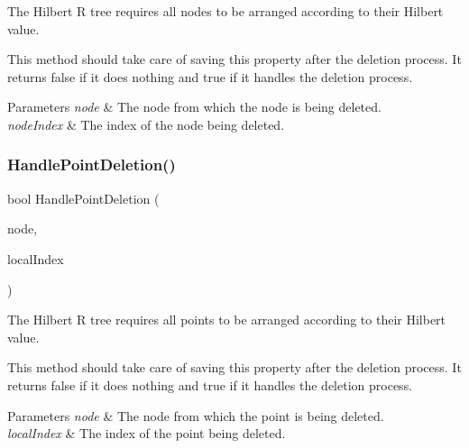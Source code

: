 The Hilbert R tree requires all nodes to be arranged according to their Hilbert value. 

This method should take care of saving this property after the deletion process. It returns false if it does nothing and true if it handles the deletion process.


\begin{DoxyParams}{Parameters}
{\em node} & The node from which the node is being deleted. \\
\hline
{\em node\+Index} & The index of the node being deleted. \\
\hline
\end{DoxyParams}
\mbox{\label{classmlpack_1_1tree_1_1HilbertRTreeAuxiliaryInformation_a58597b934c75ead9344fc5c75c753e10}} 
\subsubsection{Handle\+Point\+Deletion()}
{\footnotesize\ttfamily bool Handle\+Point\+Deletion (\begin{DoxyParamCaption}\item[{Tree\+Type $\ast$}]{node,  }\item[{const size\+\_\+t}]{local\+Index }\end{DoxyParamCaption})}



The Hilbert R tree requires all points to be arranged according to their Hilbert value. 

This method should take care of saving this property after the deletion process. It returns false if it does nothing and true if it handles the deletion process.


\begin{DoxyParams}{Parameters}
{\em node} & The node from which the point is being deleted. \\
\hline
{\em local\+Index} & The index of the point being deleted. \\
\hline
\end{DoxyParams}
\mbox{\label{classmlpack_1_1tree_1_1HilbertRTreeAuxiliaryInformation_ac39067caca6160fc68464a2ac3896616}} 

